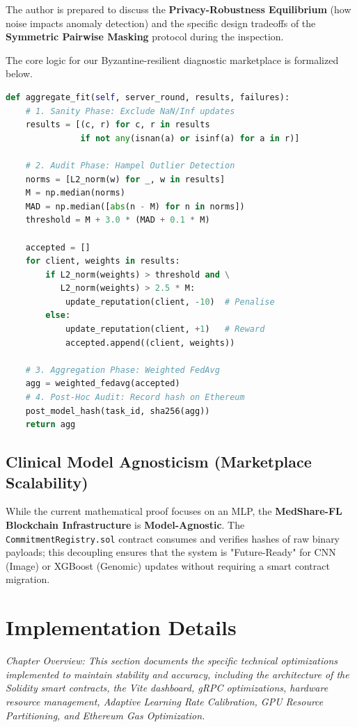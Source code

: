 \documentclass[10pt, a4paper, twocolumn]{article}
\begin{document}
The author is prepared to discuss the \textbf{Privacy-Robustness Equilibrium} (how noise impacts anomaly detection) and the specific design tradeoffs of the \textbf{Symmetric Pairwise Masking} protocol during the inspection.

The core logic for our Byzantine-resilient diagnostic marketplace is formalized below.

\begin{lstlisting}[language=Python, caption={MedShare-FL Aggregation Algorithm}]
def aggregate_fit(self, server_round, results, failures):
    # 1. Sanity Phase: Exclude NaN/Inf updates
    results = [(c, r) for c, r in results
               if not any(isnan(a) or isinf(a) for a in r)]
    
    # 2. Audit Phase: Hampel Outlier Detection
    norms = [L2_norm(w) for _, w in results]
    M = np.median(norms)
    MAD = np.median([abs(n - M) for n in norms])
    threshold = M + 3.0 * (MAD + 0.1 * M)
    
    accepted = []
    for client, weights in results:
        if L2_norm(weights) > threshold and \
           L2_norm(weights) > 2.5 * M:
            update_reputation(client, -10)  # Penalise
        else:
            update_reputation(client, +1)   # Reward
            accepted.append((client, weights))
    
    # 3. Aggregation Phase: Weighted FedAvg
    agg = weighted_fedavg(accepted)
    # 4. Post-Hoc Audit: Record hash on Ethereum
    post_model_hash(task_id, sha256(agg))
    return agg
\end{lstlisting}

 \subsection{Clinical Model Agnosticism (Marketplace Scalability)}
While the current mathematical proof focuses on an MLP, the \textbf{MedShare-FL Blockchain Infrastructure} is \textbf{Model-Agnostic}. The \texttt{CommitmentRegistry.sol} contract consumes and verifies hashes of raw binary payloads; this decoupling ensures that the system is "Future-Ready" for CNN (Image) or XGBoost (Genomic) updates without requiring a smart contract migration.

\section{Implementation Details}
\label{sec:implementation}

\textit{Chapter Overview: This section documents the specific technical optimizations implemented to maintain stability and accuracy, including the architecture of the Solidity smart contracts, the Vite dashboard, gRPC optimizations, hardware resource management, Adaptive Learning Rate Calibration, GPU Resource Partitioning, and Ethereum Gas Optimization.}
\end{document}
